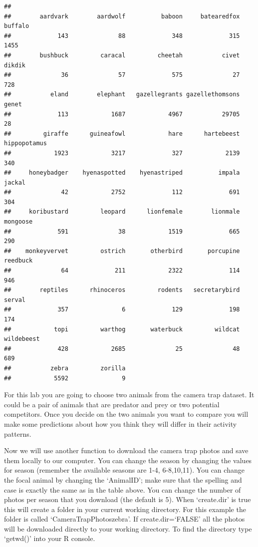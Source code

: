 \documentclass[]{book}
\begin{document}
\begin{verbatim}
## 
##        aardvark        aardwolf          baboon     batearedfox         buffalo 
##             143              88             348             315            1455 
##        bushbuck         caracal         cheetah           civet          dikdik 
##              36              57             575              27             728 
##           eland        elephant   gazellegrants gazellethomsons           genet 
##             113            1687            4967           29705              28 
##         giraffe      guineafowl            hare      hartebeest    hippopotamus 
##            1923            3217             327            2139             340 
##     honeybadger    hyenaspotted    hyenastriped          impala          jackal 
##              42            2752             112             691             304 
##     koribustard         leopard      lionfemale        lionmale        mongoose 
##             591              38            1519             665             290 
##    monkeyvervet         ostrich       otherbird       porcupine        reedbuck 
##              64             211            2322             114             946 
##        reptiles      rhinoceros         rodents   secretarybird          serval 
##             357               6             129             198             174 
##            topi         warthog       waterbuck         wildcat      wildebeest 
##             428            2685              25              48             689 
##           zebra         zorilla 
##            5592               9
\end{verbatim}

For this lab you are going to choose two animals from the camera trap dataset. It could be a pair of animals that are predator and prey or two potential competitors. Once you decide on the two animals you want to compare you will make some predictions about how you think they will differ in their activity patterns.

Now we will use another function to download the camera trap photos and save them locally to our computer. You can change the season by changing the values for season (remember the available seasons are 1-4, 6-8,10,11). You can change the focal animal by changing the `AnimalID'; make sure that the spelling and case is exactly the same as in the table above. You can change the number of photos per season that you download (the default is 5). When `create.dir' is true this will create a folder in your current working directory. For this example the folder is called `CameraTrapPhotoszebra'. If create.dir=`FALSE' all the photos will be downloaded directly to your working directory. To find the directory type `getwd()' into your R console.
\end{document}
